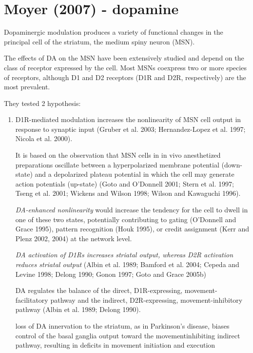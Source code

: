 \section{Moyer (2007) - dopamine}
\label{sec:MSN_Moyer2007}

Dopaminergic modulation produces a variety of functional changes in the principal cell of the
striatum, the medium spiny neuron (MSN). 

The effects of DA on the MSN have been extensively studied and depend on the
class of receptor expressed by the cell. Most MSNs coexpress two or more species
of receptors, although D1 and D2 receptors (D1R and D2R, respectively) are the
most prevalent.

They tested 2 hypothesis:

\begin{enumerate}

  \item D1R-mediated modulation increases the nonlinearity
of MSN cell output in response to synaptic input (Gruber et al. 2003;
Hernandez-Lopez et al. 1997; Nicola et al. 2000).

It is based on the observation that MSN cells in in vivo anesthetized
preparations oscillate between a hyperpolarized membrane potential (down-state)
and a depolarized plateau potential in which the cell may generate action
potentials (up-state) (Goto and O'Donnell 2001; Stern et al. 1997; Tseng et al.
2001; Wickens and Wilson 1998; Wilson and Kawaguchi 1996).

{\it DA-enhanced nonlinearity} would increase the tendency for the cell to dwell
in one of these two states, potentially contributing to gating (O'Donnell and Grace
1995), pattern recognition (Houk 1995), or credit assignment (Kerr and Plenz
2002, 2004) at the network level.

{\it DA activation of D1Rs increases striatal output, whereas D2R activation
reduces striatal output} (Albin et al. 1989; Bamford et al. 2004; Cepeda and
Levine 1998; Delong 1990; Gonon 1997; Goto and Grace 2005b)

DA regulates the balance of the direct, D1R-expressing, movement-facilitatory
pathway and the indirect, D2R-expressing, movement-inhibitory pathway (Albin et
al. 1989; Delong 1990).

loss of DA innervation to the striatum, as in Parkinson's disease, biases
control of the basal ganglia output toward the movementinhibiting
indirect pathway, resulting in deficits in movement
initiation and execution
 

\end{enumerate}
